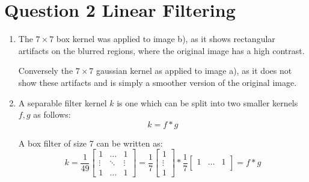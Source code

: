 \documentclass[12pt,letterpaper]{article}
\begin{document}
\section*{Question 2 Linear Filtering}
\begin{enumerate}[label=(\alph*)]
    \item The \( 7\times7 \) box kernel was applied to image b), as it shows 
    rectangular artifacts on the blurred regions, where the original image has a high contrast.

    Conversely the \( 7\times7 \) gaussian kernel as applied to image a), as it does not show 
    these artifacts and is simply a smoother version of the original image.

    \item A separable filter kernel \( k \) is one which can be split into two smaller kernels \( f,g \) as follows:
        \begin{equation}
            k = f * g
        \end{equation}

        A box filter of size 7 can be written as:
        \begin{equation}
            k = \frac{1}{49} \begin{bmatrix}
                1 & \hdots &1 \\
                \vdots & \ddots & \vdots \\
                1 & \hdots &1 
            \end{bmatrix}  
            =
            \frac{1}{7} \begin{bmatrix}
                1 \\
                \vdots \\
               1 
            \end{bmatrix}
            *
            \frac{1}{7} \begin{bmatrix}
                1 & \hdots & 1 \\
            \end{bmatrix}
            = f * g
        \end{equation}
\end{enumerate}


\newpage
\end{document}

